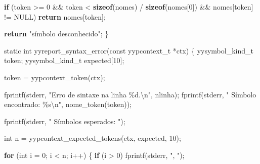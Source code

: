 \documentclass[
  brazilian,
  letterpaper,
]{book}
\newenvironment{Shaded}{\begin{snugshade}}{\end{snugshade}}
\newcommand{\ControlFlowTok}[1]{\textcolor[rgb]{0.00,0.23,0.31}{\textbf{#1}}}
\newcommand{\DataTypeTok}[1]{\textcolor[rgb]{0.68,0.00,0.00}{#1}}
\newcommand{\DecValTok}[1]{\textcolor[rgb]{0.68,0.00,0.00}{#1}}
\newcommand{\KeywordTok}[1]{\textcolor[rgb]{0.00,0.23,0.31}{\textbf{#1}}}
\newcommand{\NormalTok}[1]{\textcolor[rgb]{0.00,0.23,0.31}{#1}}
\newcommand{\OperatorTok}[1]{\textcolor[rgb]{0.37,0.37,0.37}{#1}}
\newcommand{\SpecialCharTok}[1]{\textcolor[rgb]{0.37,0.37,0.37}{#1}}
\newcommand{\StringTok}[1]{\textcolor[rgb]{0.13,0.47,0.30}{#1}}
\theoremstyle{plain}
\theoremstyle{definition}
\theoremstyle{remark}
\begin{document}
\begin{Shaded}
\begin{Highlighting}[]
    \ControlFlowTok{if} \OperatorTok{(}\NormalTok{token }\OperatorTok{\textgreater{}=} \DecValTok{0} \OperatorTok{\&\&}
\NormalTok{        token }\OperatorTok{\textless{}} \KeywordTok{sizeof}\OperatorTok{(}\NormalTok{nomes}\OperatorTok{)} \OperatorTok{/} \KeywordTok{sizeof}\OperatorTok{(}\NormalTok{nomes}\OperatorTok{[}\DecValTok{0}\OperatorTok{])} \OperatorTok{\&\&}
\NormalTok{        nomes}\OperatorTok{[}\NormalTok{token}\OperatorTok{]} \OperatorTok{!=}\NormalTok{ NULL}\OperatorTok{)}
        \ControlFlowTok{return}\NormalTok{ nomes}\OperatorTok{[}\NormalTok{token}\OperatorTok{];}

    \ControlFlowTok{return} \StringTok{"símbolo desconhecido"}\OperatorTok{;}
\OperatorTok{\}}

\DataTypeTok{static} \DataTypeTok{int}\NormalTok{ yyreport\_syntax\_error}\OperatorTok{(}\DataTypeTok{const}\NormalTok{ yypcontext\_t }\OperatorTok{*}\NormalTok{ctx}\OperatorTok{)}
\OperatorTok{\{}
\NormalTok{    yysymbol\_kind\_t token}\OperatorTok{;}
\NormalTok{    yysymbol\_kind\_t expected}\OperatorTok{[}\DecValTok{10}\OperatorTok{];}

\NormalTok{    token }\OperatorTok{=}\NormalTok{ yypcontext\_token}\OperatorTok{(}\NormalTok{ctx}\OperatorTok{);}

\NormalTok{    fprintf}\OperatorTok{(}\NormalTok{stderr}\OperatorTok{,} \StringTok{"Erro de sintaxe na linha }\SpecialCharTok{\%d}\StringTok{.}\SpecialCharTok{\textbackslash{}n}\StringTok{"}\OperatorTok{,}\NormalTok{ nlinha}\OperatorTok{);}
\NormalTok{    fprintf}\OperatorTok{(}\NormalTok{stderr}\OperatorTok{,} \StringTok{"  Símbolo encontrado: }\SpecialCharTok{\%s\textbackslash{}n}\StringTok{"}\OperatorTok{,}
\NormalTok{            nome\_token}\OperatorTok{(}\NormalTok{token}\OperatorTok{));}

\NormalTok{    fprintf}\OperatorTok{(}\NormalTok{stderr}\OperatorTok{,} \StringTok{"  Símbolos esperados: "}\OperatorTok{);}

    \DataTypeTok{int}\NormalTok{ n }\OperatorTok{=}\NormalTok{ yypcontext\_expected\_tokens}\OperatorTok{(}\NormalTok{ctx}\OperatorTok{,}\NormalTok{ expected}\OperatorTok{,} \DecValTok{10}\OperatorTok{);}

    \ControlFlowTok{for} \OperatorTok{(}\DataTypeTok{int}\NormalTok{ i }\OperatorTok{=} \DecValTok{0}\OperatorTok{;}\NormalTok{ i }\OperatorTok{\textless{}}\NormalTok{ n}\OperatorTok{;}\NormalTok{ i}\OperatorTok{++)} \OperatorTok{\{}
        \ControlFlowTok{if} \OperatorTok{(}\NormalTok{i }\OperatorTok{\textgreater{}} \DecValTok{0}\OperatorTok{)}
\NormalTok{            fprintf}\OperatorTok{(}\NormalTok{stderr}\OperatorTok{,} \StringTok{", "}\OperatorTok{);}


\end{Highlighting}
\end{Shaded}
\end{document}
